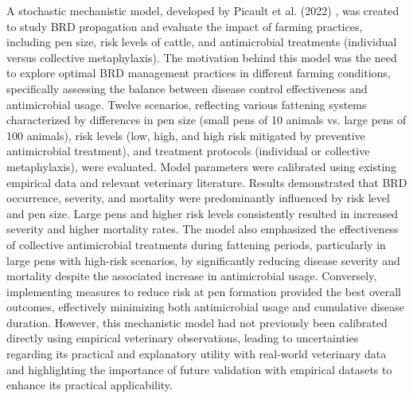 
A stochastic mechanistic model, developed by Picault et al. (2022) \cite{picault_modelling_2022}, was created to study BRD propagation and evaluate the impact of farming practices, including pen size, risk levels of cattle, and antimicrobial treatments (individual versus collective metaphylaxis). The motivation behind this model was the need to explore optimal BRD management practices in different farming conditions, specifically assessing the balance between disease control effectiveness and antimicrobial usage. Twelve scenarios, reflecting various fattening systems characterized by differences in pen size (small pens of 10 animals vs. large pens of 100 animals), risk levels (low, high, and high risk mitigated by preventive antimicrobial treatment), and treatment protocols (individual or collective metaphylaxis), were evaluated. Model parameters were calibrated using existing empirical data and relevant veterinary literature. Results demonstrated that BRD occurrence, severity, and mortality were predominantly influenced by risk level and pen size. Large pens and higher risk levels consistently resulted in increased severity and higher mortality rates. The model also emphasized the effectiveness of collective antimicrobial treatments during fattening periods, particularly in large pens with high-risk scenarios, by significantly reducing disease severity and mortality despite the associated increase in antimicrobial usage. Conversely, implementing measures to reduce risk at pen formation provided the best overall outcomes, effectively minimizing both antimicrobial usage and cumulative disease duration. However, this mechanistic model had not previously been calibrated directly using empirical veterinary observations, leading to uncertainties regarding its practical and explanatory utility with real-world veterinary data and highlighting the importance of future validation with empirical datasets to enhance its practical applicability.

